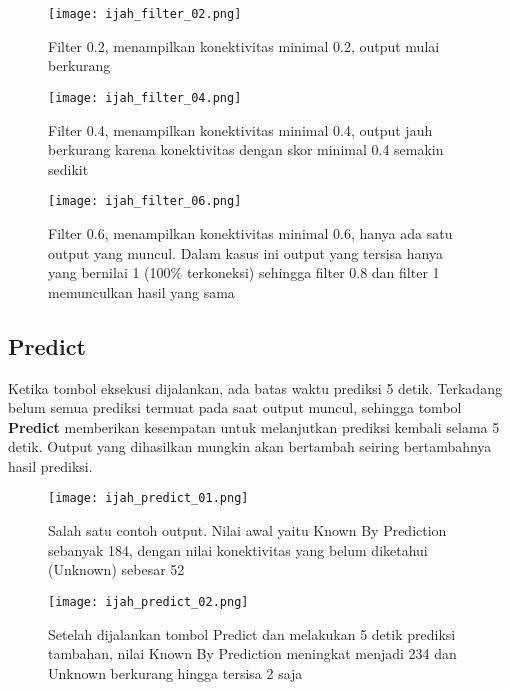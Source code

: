 	\begin{figure}[H]
	\centering
	\texttt{[image: ijah\_filter\_02.png]}
	\caption{Filter 0.2, menampilkan konektivitas minimal 0.2, output mulai berkurang}
	\label{fig:ijah_filter_02}
	\end{figure}

	\begin{figure}[H]
	\centering
	\texttt{[image: ijah\_filter\_04.png]}
	\caption{Filter 0.4, menampilkan konektivitas minimal 0.4, output jauh berkurang karena konektivitas dengan skor minimal 0.4 semakin sedikit}
	\label{fig:ijah_filter_04}
	\end{figure}

	\begin{figure}[H]
	\centering
	\texttt{[image: ijah\_filter\_06.png]}
	\caption{Filter 0.6, menampilkan konektivitas minimal 0.6, hanya ada satu output yang muncul. Dalam kasus ini output yang tersisa hanya yang bernilai 1 (100\% terkoneksi) sehingga filter 0.8 dan filter 1 memunculkan hasil yang sama}
	\label{fig:ijah_filter_02}
	\end{figure}

	\subsection{Predict} \label{predictmore}
	Ketika tombol eksekusi dijalankan, ada batas waktu prediksi 5 detik. Terkadang belum semua prediksi termuat pada saat output muncul, sehingga tombol \textbf{Predict} memberikan kesempatan untuk melanjutkan prediksi kembali selama 5 detik. Output yang dihasilkan mungkin akan bertambah seiring bertambahnya hasil prediksi.

	\begin{figure}[H]
	\centering
	\texttt{[image: ijah\_predict\_01.png]}
	\caption{Salah satu contoh output. Nilai awal yaitu Known By Prediction sebanyak 184, dengan nilai konektivitas yang belum diketahui (Unknown) sebesar 52}
	\label{fig:ijah_predict_01}
	\end{figure}

	\begin{figure}[H]
	\centering
	\texttt{[image: ijah\_predict\_02.png]}
	\caption{Setelah dijalankan tombol Predict dan melakukan 5 detik prediksi tambahan, nilai Known By Prediction meningkat menjadi 234 dan Unknown berkurang hingga tersisa 2 saja}
	\label{fig:ijah_predict_02}
	\end{figure}
